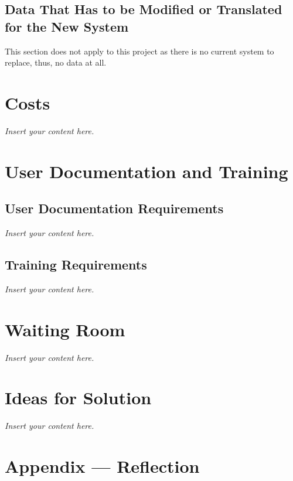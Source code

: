 \documentclass[12pt]{article}
\newcommand{\lips}{\textit{Insert your content here.}}
\begin{document}
\subsection{Data That Has to be Modified or Translated for the New System}
This section does not apply to this project as there is no current system to replace, thus, no data at all.

\section{Costs}
\lips
\section{User Documentation and Training}
\subsection{User Documentation Requirements}
\lips
\subsection{Training Requirements}
\lips

\section{Waiting Room}
\lips

\section{Ideas for Solution}
\lips

\newpage{}
\section*{Appendix --- Reflection}




\end{document}

